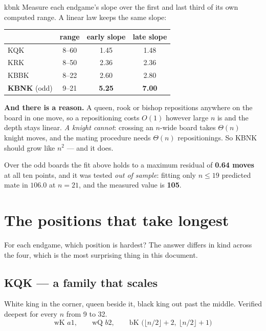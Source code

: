 \documentclass[11pt]{article}
\begin{document}
\begin{result}[title={KBNK is the only one that bends}]{kbnk}
Measure each endgame's slope over the first and last third of its own computed
range. A linear law keeps the same slope:

\smallskip
\begin{center}\small
\begin{tabular}{@{}lccc@{}}
\toprule
 & range & early slope & late slope \\
\midrule
KQK  & 8--60 & 1.45 & 1.48 \\
KRK  & 8--50 & 2.36 & 2.36 \\
KBBK & 8--22 & 2.60 & 2.80 \\
\textbf{KBNK} (odd) & 9--21 & \textbf{5.25} & \textbf{7.00} \\
\bottomrule
\end{tabular}
\end{center}

\smallskip
\textbf{And there is a reason.} A queen, rook or bishop repositions anywhere on
the board in one move, so a repositioning costs $O(1)$ however large $n$ is and
the depth stays linear. \emph{A knight cannot}: crossing an $n$-wide board takes
$\Theta(n)$ knight moves, and the mating procedure needs $\Theta(n)$
repositionings. So KBNK should grow like $n^2$ --- and it does.

\smallskip
Over the odd boards the fit above holds to a maximum residual of
\textbf{0.64 moves} at all ten points, and it was tested \emph{out of sample}:
fitting only $n \le 19$ predicted mate in $106.0$ at $n=21$, and the measured
value is \textbf{105}.
\end{result}

\clearpage
\section{The positions that take longest}\label{sec:longest}

For each endgame, which position is hardest? The answer differs in kind across
the four, which is the most surprising thing in this document.

\subsection{KQK --- a family that scales}\label{sub:kqk-family}

White king in the corner, queen beside it, black king out past the middle.
Verified deepest for every $n$ from 9 to 32.
\[ \text{wK }a1,\qquad \text{wQ }b2,\qquad
   \text{bK } \bigl(\lfloor n/2\rfloor+2,\ \lfloor n/2\rfloor+1\bigr) \]
\end{document}
